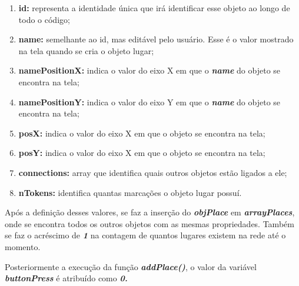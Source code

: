 \documentclass[
	12pt,				%
	openright,			%
	oneside,			%
	a4paper,			%
	english,			%
	brazil				%
	]{abntex2}
\begin{document}
\begin{enumerate}
	\item \textbf{id:} representa a identidade única que irá identificar esse objeto ao longo de todo o código;
	\item \textbf{name:} semelhante ao id, mas editável pelo usuário. Esse é o valor mostrado na tela quando se cria o objeto lugar;
	\item \textbf{namePositionX:} indica o valor do eixo X em que o \textbf{\textit{name}} do objeto se encontra na tela;
	\item \textbf{namePositionY:} indica o valor do eixo Y em que o \textbf{\textit{name}} do objeto se encontra na tela;
	\item \textbf{posX:} indica o valor do eixo X em que o objeto se encontra na tela;
	\item \textbf{posY:} indica o valor do eixo X em que o objeto se encontra na tela;
	\item \textbf{connections:} array que identifica quais outros objetos estão ligados a ele;\label{prop:connections}
	\item \textbf{nTokens:} identifica quantas marcações o objeto lugar possuí.
\end{enumerate}

Após a definição desses valores, se faz a inserção do \textbf{\textit{objPlace}} em \textbf{\textit{arrayPlaces}}, onde se encontra todos os outros objetos com as mesmas propriedades. Também se faz o acréscimo de \textbf{\textit{1}} na contagem de quantos lugares existem na rede até o momento.



Posteriormente a execução da função \textbf{\textit{addPlace()}}, o valor da variável \textbf{\textit{buttonPress}} é atribuído como \textbf{\textit{0.}}
\end{document}
